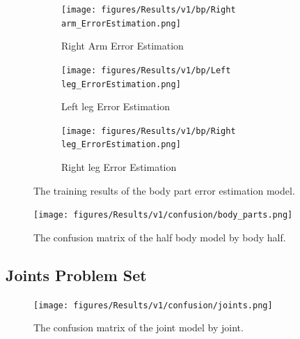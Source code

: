 \begin{figure}[ht]
  \begin{subfigure}[b]{0.9\linewidth}
      \centering
      \texttt{[image: figures/Results/v1/bp/Right arm\_ErrorEstimation.png]}
      \caption{Right Arm Error Estimation}
      \label{fig:riar_lb_ee}
  \end{subfigure}
  \hfill
  \begin{subfigure}[b]{0.9\linewidth}
      \centering
      \texttt{[image: figures/Results/v1/bp/Left leg\_ErrorEstimation.png]}
      \caption{Left leg Error Estimation}
      \label{fig:lele_lb_ee}
  \end{subfigure}
  \hfill
  \begin{subfigure}[b]{0.9\linewidth}
      \centering
      \texttt{[image: figures/Results/v1/bp/Right leg\_ErrorEstimation.png]}
      \caption{Right leg Error Estimation}
      \label{fig:rileg_lb_ee}
  \end{subfigure}
  \hfill
  \caption[Limb model training results]{The training results of the body part error estimation model.}
  \label{fig:body part_training_results}
\end{figure}

\begin{figure}[ht]
  \centering
  \texttt{[image: figures/Results/v1/confusion/body\_parts.png]}
  \caption[Half Body Model Confusion Matrix by Body Half]{The confusion matrix of the half body model by body half.}
  \label{fig:conf_v1_bp}
\end{figure}

\subsection{Joints Problem Set}



\begin{figure}[ht]
  \centering
  \texttt{[image: figures/Results/v1/confusion/joints.png]}
  \caption[Joint Model Confusion Matrix by Joint]{The confusion matrix of the joint model by joint.}
  \label{fig:conf_v1_bp}
\end{figure}